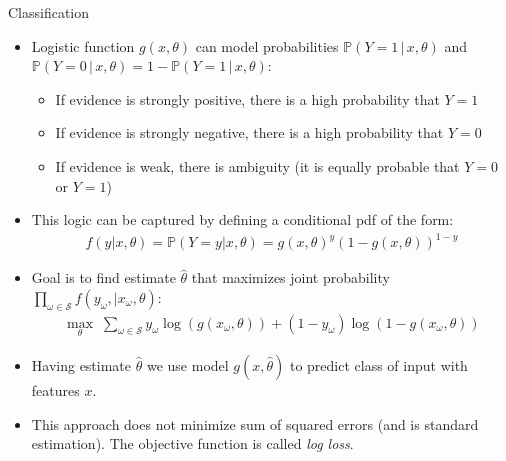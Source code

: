 \documentclass[handout,9pt]{beamer}
\begin{document}
\begin{frame}{Classification}


\begin{itemize}
  \setlength{\itemsep}{10pt}
\item Logistic function $g(x,\theta)$ can model probabilities $\mathbb{P}(Y=1\,|\,x,\theta)$ and $\mathbb{P}(Y=0\,|\,x,\theta)=1-\mathbb{P}(Y=1\,|\,x,\theta)$:

\vspace{0.1in}
\begin{itemize}
  \setlength{\itemsep}{10pt}
\item If evidence is strongly positive, there is a high probability that $Y=1$
\item If evidence is strongly negative, there is a high probability that  $Y=0$
\item If evidence is weak, there is ambiguity (it is equally probable that $Y=0$ or $Y=1$)
\end{itemize}

\item This logic can be captured by defining a conditional pdf of the form:
\begin{align*}
f(y|x,\theta)=\mathbb{P}(Y=y|x,\theta)=g(x,\theta)^y(1-g(x,\theta))^{1-y}
\end{align*}
\item Goal is to find estimate $\hat{\theta}$ that maximizes joint probability $\prod_{\omega \in \mathcal{S}}f(y_\omega,|x_\omega,\theta)$:
\begin{align*}
\max_{\theta}\; \sum_{\omega \in \mathcal{S}}y_\omega\log(g(x_\omega,\theta))+(1-y_\omega)\log(1-g(x_\omega,\theta))
\end{align*}

\item Having estimate $\hat{\theta}$ we use model $g(x,\hat{\theta})$ to predict class of input with features $x$. 

\item This approach does not minimize sum of squared errors (and is standard estimation).  The objective function is called {\em log loss}. 
\end{itemize}

\end{frame}
\end{document}
